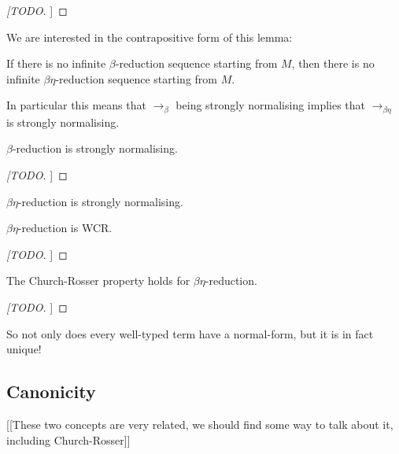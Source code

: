 \begin{proof}
    [[TODO]]
\end{proof}

We are interested in the contrapositive form of this lemma:

\begin{cor}
    If there is no infinite $\beta$-reduction sequence starting from $M$, then there is no infinite $\beta \eta$-reduction sequence starting from $M$.
\end{cor}

\begin{remark}
    In particular this means that $\to_{\beta}$ being strongly normalising implies that $\to_{\beta \eta}$ is strongly normalising.
\end{remark}

\begin{theorem}
    $\beta$-reduction is strongly normalising.
\end{theorem}

\begin{proof}
    [[TODO]]
\end{proof}

\begin{cor}
    $\beta \eta$-reduction is strongly normalising.
\end{cor}

\begin{lemma}
    $\beta \eta$-reduction is WCR.
\end{lemma}

\begin{proof}
    [[TODO]]
\end{proof}

\begin{theorem}
    The Church-Rosser property holds for $\beta \eta$-reduction.
\end{theorem}

\begin{proof}
    [[TODO]]
\end{proof}

\begin{remark}
    So not only does every well-typed term have a normal-form, but it is in fact unique!
\end{remark}

\subsection{Canonicity}



[[These two concepts are very related, we should find some way to talk about it, including Church-Rosser]]
